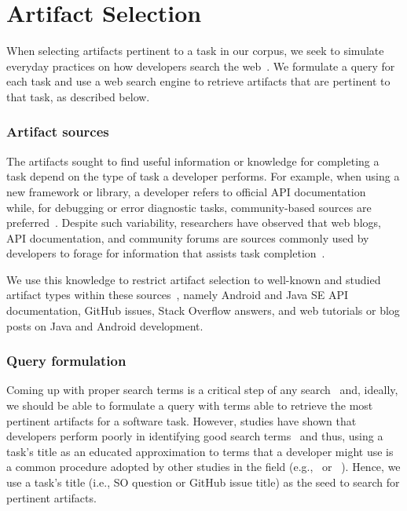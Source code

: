 
\section{Artifact Selection}
\label{cp4:corpus-artifacts}


When selecting artifacts pertinent to a task in our corpus, we seek to simulate everyday practices on how developers search the web~\cite{rao2020, Xia2017}.
We formulate a query for each task and use a web search engine to retrieve artifacts that are pertinent to that task, as described below.


\subsubsection{Artifact sources}



The artifacts sought to find useful information or knowledge for completing a task
 depend on the type of task a developer performs.
For example, when using a new framework or library, a developer refers to official API documentation~\cite{Li2013,robillard2011field} while, for debugging or error diagnostic tasks, community-based sources are preferred~\cite{Li2013,Breu2010}.
Despite such variability, researchers have observed that web blogs, API documentation, and community forums are sources
commonly used by developers to forage for information that assists task completion~\cite{Li2013, josyula2018}.



We use this knowledge to restrict artifact selection to well-known and studied artifact types within these sources~\cite{Starke2009,Kevic2014, Li2013}, namely Android and Java SE API documentation, GitHub issues, Stack Overflow answers, and web tutorials or blog posts on Java and Android development.





\subsubsection{Query formulation}



Coming up with proper search terms is a critical step of any search~\cite{Haiduc2013}
and, ideally, we should be able to formulate a query with terms able to retrieve the most pertinent artifacts for a software task.
However, studies have shown that developers perform poorly in identifying good search terms~\cite{latoza2006, Starke2009,Kevic2014} and thus, using a task's title
as an educated approximation to terms that a developer might use is a common procedure adopted by other studies in the field (e.g.,~\cite{Xu2017} or ~\cite{silva2019}).
Hence, we use a task's title (i.e., SO question or GitHub issue title) as the seed to search for pertinent artifacts.



